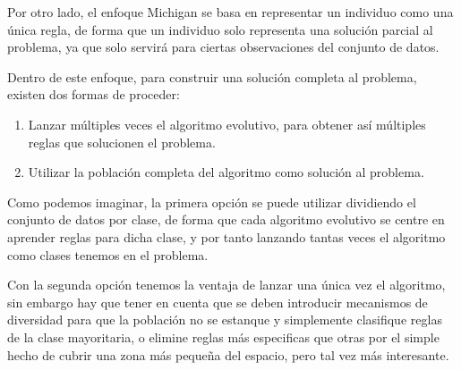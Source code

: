 Por otro lado, el enfoque Michigan se basa en representar un individuo como una única regla, de forma que un individuo solo representa una solución parcial al problema, ya que solo servirá para ciertas observaciones del conjunto de datos.

Dentro de este enfoque, para construir una solución completa al problema, existen dos formas de proceder:

\begin{enumerate}
	\item Lanzar múltiples veces el algoritmo evolutivo, para obtener así múltiples reglas que solucionen el problema.
	\item Utilizar la población completa del algoritmo como solución al problema.
\end{enumerate}

Como podemos imaginar, la primera opción se puede utilizar dividiendo el conjunto de datos por clase, de forma que cada algoritmo evolutivo se centre en aprender reglas para dicha clase, y por tanto lanzando tantas veces el algoritmo como clases tenemos en el problema.

Con la segunda opción tenemos la ventaja de lanzar una única vez el algoritmo, sin embargo hay que tener en cuenta que se deben introducir mecanismos de diversidad para que la población no se estanque y simplemente clasifique reglas de la clase mayoritaria, o elimine reglas más especificas que otras por el simple hecho de cubrir una zona más pequeña del espacio, pero tal vez más interesante.



\newpage
